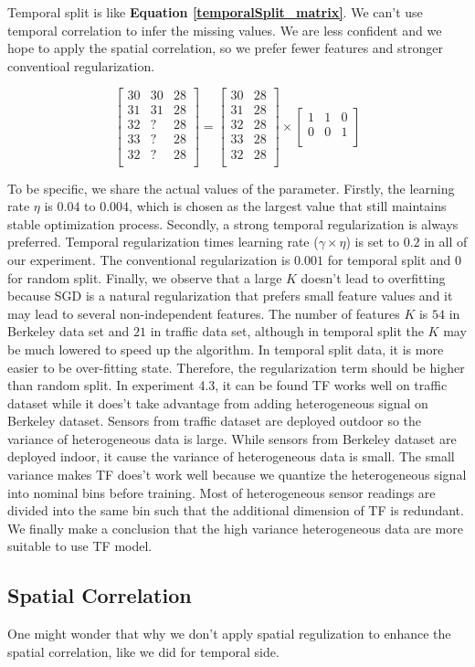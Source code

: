 Temporal split is like \textbf{Equation \ref{temporalSplit_matrix}}. We can't use temporal correlation to infer the missing values. We are less confident and we hope to apply the spatial correlation, so we prefer fewer features and stronger conventioal regularization.

\begin{equation}
\label{temporalSplit_matrix}
\begin{bmatrix}
30 & 30 & 28\\
31 & 31 & 28\\
32 &  ? & 28\\
33 &  ? & 28\\
32 &  ? & 28\\
\end{bmatrix} 
= 
\begin{bmatrix}
30 & 28\\
31 & 28\\
32 & 28\\
33 & 28\\
32 & 28\\
\end{bmatrix} 
\times
\begin{bmatrix}
1 & 1 & 0\\
0 & 0 & 1\\
\end{bmatrix} 
\end{equation}

To be specific, we share the actual values of the parameter. Firstly, the learning rate $\eta$ is $0.04$ to $0.004$, which is chosen as the largest value that still maintains stable optimization process. Secondly, a strong temporal regularization is always preferred. Temporal regularization times learning rate ($\gamma \times \eta$) is set to $0.2$ in all of our experiment. The conventional regularization is $0.001$ for temporal split and $0$ for random split. Finally, we observe that a large $K$ doesn't lead to overfitting because SGD is a natural regularization that prefers small feature values and it may lead to several non-independent features. The number of features $K$ is $54$ in Berkeley data set and $21$ in traffic data set, although in temporal split the $K$ may be much lowered to speed up the algorithm. 
In temporal split data, it is more easier to be over-fitting state. Therefore, the regularization term should be higher than random split.
In experiment 4.3, it can be found TF works well on traffic dataset while it does't take advantage from adding heterogeneous signal on Berkeley dataset. Sensors from traffic dataset are deployed outdoor so the variance of heterogeneous data is large. While sensors from Berkeley dataset are deployed indoor, it cause the variance of heterogeneous data is small. The small variance makes TF does't work well because we quantize the heterogeneous signal into nominal bins before training. Most of heterogeneous sensor readings are divided into the same bin such that the additional dimension of TF is redundant.
We finally make a conclusion that the high variance heterogeneous data are more suitable to use TF model.

\subsection{Spatial Correlation}
One might wonder that why we don't apply spatial regulization to enhance the spatial correlation, like we did for temporal side.
